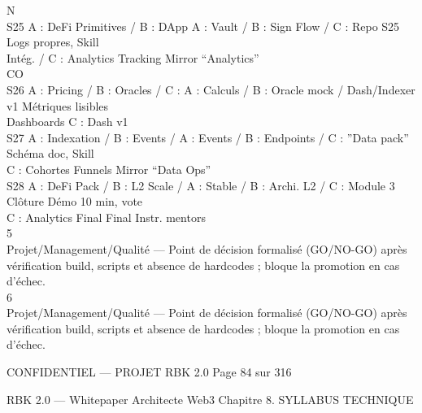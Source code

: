 \vspace{0.5em}
\vspace{0.5em}
N\\
S25 A : DeFi Primitives / B : DApp A : Vault / B : Sign Flow / C : Repo S25                       Logs propres, Skill\\
Intég. / C : Analytics           Tracking                                                     Mirror “Analytics”\\
CO\\
S26 A : Pricing / B : Oracles / C : A : Calculs / B : Oracle mock / Dash/Indexer v1               Métriques lisibles\\
Dashboards                       C : Dash v1\\
S27 A : Indexation / B : Events /    A : Events / B : Endpoints / C : ”Data pack”                 Schéma doc, Skill\\
C : Cohortes                     Funnels                                                      Mirror “Data Ops”\\
S28 A : DeFi Pack / B : L2 Scale / A : Stable / B : Archi. L2 / C : Module 3 Clôture              Démo 10 min, vote\\
C : Analytics Final              Final Instr.                                                 mentors\\
\vspace{0.5em}
\vspace{0.5em}
\vspace{0.5em}
\vspace{0.5em}
5\\
Projet/Management/Qualité — Point de décision formalisé (GO/NO-GO) après vérification build, scripts et absence de hardcodes ; bloque la promotion en cas d’échec.\\
6\\
Projet/Management/Qualité — Point de décision formalisé (GO/NO-GO) après vérification build, scripts et absence de hardcodes ; bloque la promotion en cas d’échec.\\
\vspace{0.5em}
\vspace{0.5em}
\begin{confidential}CONFIDENTIEL — PROJET RBK 2.0                                            Page 84 sur 316\end{confidential}
RBK 2.0 — Whitepaper Architecte Web3                                                                                      Chapitre 8. SYLLABUS TECHNIQUE\\
